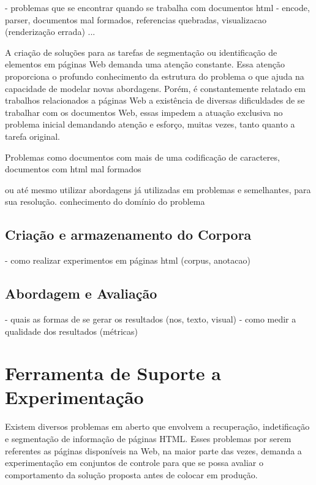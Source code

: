 \documentclass{acm_proc_article-sp}
\newcommand{\remove}[1]{}
\numberwithin{equation}{section}
\begin{document}
- problemas que se encontrar quando se trabalha com documentos html
- encode, parser, documentos mal formados, referencias quebradas,
visualizacao (renderização errada) ...

A criação de soluções para as tarefas de segmentação ou
identificação de elementos em páginas Web demanda uma atenção constante.
Essa atenção proporciona o profundo conhecimento da estrutura do problema
o que ajuda na capacidade de modelar novas abordagens. Porém,
  é constantemente relatado em trabalhos relacionados a páginas Web 
  a existência de diversas dificuldades de se trabalhar com os
  documentos Web, essas impedem a atuação exclusiva no problema inicial 
  demandando atenção e esforço, muitas vezes, tanto quanto a tarefa original.

\remove{são encontrados sub-problemas que não pertencem ao problema
  original, mas que impedem o andamento de pesquisas e experimentações
  sobre o domínio.
}

Problemas como 
    documentos com mais de uma codificação de caracteres, 
    documentos com html mal formados

ou até mesmo utilizar abordagens já utilizadas em problemas e semelhantes, para sua
resolução.
conhecimento do domínio do problema 

  \subsection{Criação e armazenamento do Corpora}
- como realizar experimentos em páginas html (corpus, anotacao)

  \subsection{Abordagem e Avaliação}
- quais as formas de se gerar os resultados (nos, texto, visual)
- como medir a qualidade dos resultados (métricas)


\section{Ferramenta de Suporte a Experimentação}

Existem diversos problemas em aberto que envolvem a
recuperação, indetificação e segmentação de 
informação de páginas HTML. Esses problemas por serem referentes as
páginas disponíveis na Web, na maior parte das vezes, demanda a
experimentação em conjuntos de controle para que se possa avaliar o
comportamento da solução proposta antes de colocar em produção.
\end{document}
